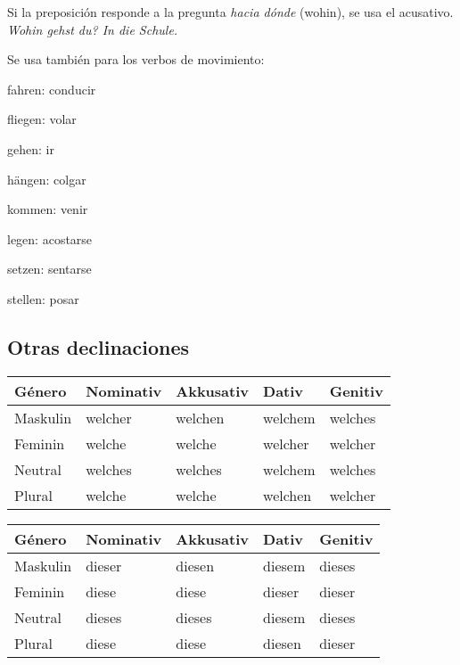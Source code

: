 Si la preposición responde a la pregunta \textit{hacia dónde} (wohin), se usa el acusativo. \textit{Wohin gehst du? In die Schule.} 

Se usa también para los verbos de movimiento:
\begin{multicols}{3}
\begin{myitemize}
\item fahren: conducir
\item fliegen: volar
\item gehen: ir
\item hängen: colgar
\item kommen: venir
\item legen: acostarse
\item setzen: sentarse
\item stellen: posar
\end{myitemize}
\end{multicols}

\subsection{Otras declinaciones}
\begin{tabular}{| l | l | l | l | l |}
\hline
\textbf{Género} & \textbf{Nominativ} & \textbf{Akkusativ} & \textbf{Dativ} & \textbf{Genitiv}\\
\hline
Maskulin & welcher & welchen & welchem & welches \\
Feminin  & welche  & welche  & welcher & welcher \\
Neutral  & welches & welches & welchem & welches \\
Plural   & welche  & welche  & welchen & welcher \\
\hline
\end{tabular}

\begin{tabular}{| l | l | l | l | l |}
\hline
\textbf{Género} & \textbf{Nominativ} & \textbf{Akkusativ} & \textbf{Dativ} & \textbf{Genitiv}\\
\hline
Maskulin & dieser & diesen & diesem & dieses \\
Feminin  & diese  & diese  & dieser & dieser \\
Neutral  & dieses & dieses & diesem & dieses \\
Plural   & diese  & diese  & diesen & dieser \\
\hline
\end{tabular}

